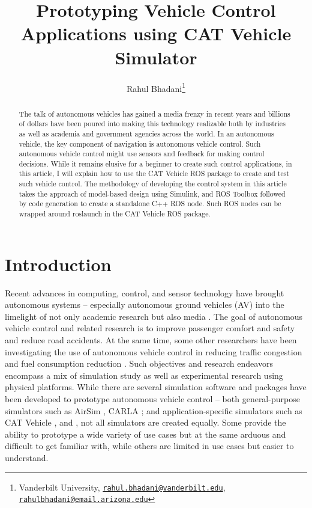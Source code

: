 \documentclass[
]{article}
\title{Prototyping Vehicle Control Applications using CAT Vehicle
Simulator}
\author{Rahul Bhadani\footnote{Vanderbilt University,
  \href{mailto:rahul.bhadani@vanderbilt.edu}{\nolinkurl{rahul.bhadani@vanderbilt.edu}},
  \href{mailto:rahulbhadani@email.arizona.edu}{\nolinkurl{rahulbhadani@email.arizona.edu}}}}
\date{}
\begin{document}
\maketitle
\begin{abstract}
The talk of autonomous vehicles has gained a media frenzy in recent
years and billions of dollars have been poured into making this
technology realizable both by industries as well as academia and
government agencies across the world. In an autonomous vehicle, the key
component of navigation is autonomous vehicle control. Such autonomous
vehicle control might use sensors and feedback for making control
decisions. While it remains elusive for a beginner to create such
control applications, in this article, I will explain how to use the CAT
Vehicle ROS package to create and test such vehicle control. The
methodology of developing the control system in this article takes the
approach of model-based design using Simulink, and ROS Toolbox followed
by code generation to create a standalone C++ ROS node. Such ROS nodes
can be wrapped around roslaunch in the CAT Vehicle ROS package.
\end{abstract}

\hypertarget{methods}{%
\section{Introduction}\label{methods}}

Recent advances in computing, control, and sensor technology have
brought autonomous systems -- especially autonomous ground vehicles (AV)
into the limelight of not only academic research but also media
\autocite{zhu2020modelling}. The goal of autonomous vehicle control and
related research is to improve passenger comfort and safety
\autocite{du2018velocity,mohajer2020enhancing} and reduce road
accidents\autocite{michalowska2017autonomous}. At the same time, some
other researchers have been investigating the use of autonomous vehicle
control in reducing traffic congestion
\autocite{delle2019feedback,stern2018dissipation,bhadani2019real,bhadani2018dissipation}
and fuel consumption reduction
\autocite{lichtle2021fuel,qin2018stability}. Such objectives and
research endeavors encompass a mix of simulation study as well as
experimental research using physical platforms. While there are several
simulation software and packages have been developed to prototype
autonomous vehicle control -- both general-purpose simulators such as
AirSim \autocite{shah2018airsim}, CARLA \autocite{dosovitskiy2017carla};
and application-specific simulators such as CAT Vehicle
\autocite{bhadani2018cat}, and \autocite{wu2017flow}, not all simulators
are created equally. Some provide the ability to prototype a wide
variety of use cases but at the same arduous and difficult to get
familiar with, while others are limited in use cases but easier to
understand.
\end{document}
